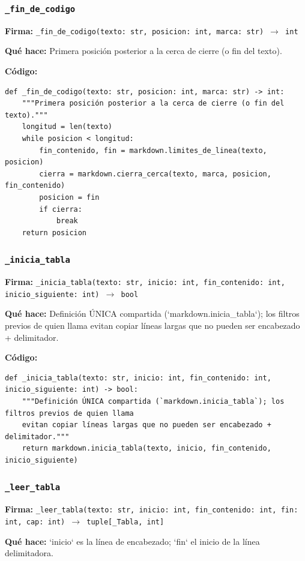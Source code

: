\documentclass[11pt,a4paper]{article}
\begin{document}
\subsubsection*{\texttt{\_fin\_de\_codigo}}
\textbf{Firma:} \texttt{\_fin\_de\_codigo(texto: str, posicion: int, marca: str) $\rightarrow$ int}

\textbf{Qué hace:} Primera posición posterior a la cerca de cierre (o fin del texto).

\textbf{Código:}
\begin{lstlisting}
def _fin_de_codigo(texto: str, posicion: int, marca: str) -> int:
    """Primera posición posterior a la cerca de cierre (o fin del texto)."""
    longitud = len(texto)
    while posicion < longitud:
        fin_contenido, fin = markdown.limites_de_linea(texto, posicion)
        cierra = markdown.cierra_cerca(texto, marca, posicion, fin_contenido)
        posicion = fin
        if cierra:
            break
    return posicion
\end{lstlisting}

\subsubsection*{\texttt{\_inicia\_tabla}}
\textbf{Firma:} \texttt{\_inicia\_tabla(texto: str, inicio: int, fin\_contenido: int, inicio\_siguiente: int) $\rightarrow$ bool}

\textbf{Qué hace:} Definición ÚNICA compartida (`markdown.inicia\_tabla`); los filtros previos de quien llama
evitan copiar líneas largas que no pueden ser encabezado + delimitador.

\textbf{Código:}
\begin{lstlisting}
def _inicia_tabla(texto: str, inicio: int, fin_contenido: int, inicio_siguiente: int) -> bool:
    """Definición ÚNICA compartida (`markdown.inicia_tabla`); los filtros previos de quien llama
    evitan copiar líneas largas que no pueden ser encabezado + delimitador."""
    return markdown.inicia_tabla(texto, inicio, fin_contenido, inicio_siguiente)
\end{lstlisting}

\subsubsection*{\texttt{\_leer\_tabla}}
\textbf{Firma:} \texttt{\_leer\_tabla(texto: str, inicio: int, fin\_contenido: int, fin: int, cap: int) $\rightarrow$ tuple[\_Tabla, int]}

\textbf{Qué hace:} `inicio` es la línea de encabezado; `fin` el inicio de la línea delimitadora.
\end{document}
